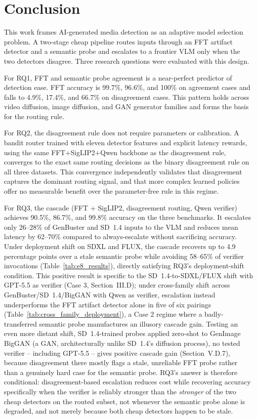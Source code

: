 \documentclass{ieeeaccess}
\begin{document}
\section{Conclusion}

This work frames AI-generated media detection as an adaptive model selection problem. A two-stage cheap pipeline routes inputs through an FFT artifact detector and a semantic probe and escalates to a frontier VLM only when the two detectors disagree. Three research questions were evaluated with this design.

For RQ1, FFT and semantic probe agreement is a near-perfect predictor of detection ease. FFT accuracy is 99.7\%, 96.6\%, and 100\% on agreement cases and falls to 4.9\%, 17.4\%, and 66.7\% on disagreement cases. This pattern holds across video diffusion, image diffusion, and GAN generator families and forms the basis for the routing rule.

For RQ2, the disagreement rule does not require parameters or calibration. A bandit router trained with eleven detector features and explicit latency rewards, using the same FFT+SigLIP2+Qwen backbone as the disagreement rule, converges to the exact same routing decisions as the binary disagreement rule on all three datasets. This convergence independently validates that disagreement captures the dominant routing signal, and that more complex learned policies offer no measurable benefit over the parameter-free rule in this regime.

For RQ3, the cascade (FFT + SigLIP2, disagreement routing, Qwen verifier) achieves 90.5\%, 86.7\%, and 99.8\% accuracy on the three benchmarks. It escalates only 26--28\% of GenBuster and SD~1.4 inputs to the VLM and reduces mean latency by 62--70\% compared to always-escalate without sacrificing accuracy. Under deployment shift on SDXL and FLUX, the cascade recovers up to 4.9 percentage
points over a stale semantic probe while avoiding 58--65\% of verifier invocations
(Table~\ref{tab:e8_results}), directly satisfying RQ3's deployment-shift condition. This
positive result is specific to the SD~1.4-to-SDXL/FLUX shift with GPT-5.5 as verifier
(Case 3, Section~III.D); under cross-family shift across GenBuster/SD~1.4/BigGAN with
Qwen as verifier, escalation instead underperforms the FFT artifact detector alone in
five of six pairings (Table~\ref{tab:cross_family_deployment}), a Case 2 regime where a
badly-transferred semantic probe manufactures an illusory cascade gain. Testing an even
more distant shift, SD~1.4-trained probes applied zero-shot to GenImage BigGAN (a GAN,
architecturally unlike SD~1.4's diffusion process), no tested verifier -- including
GPT-5.5 -- gives positive cascade gain (Section~V.D.7), because disagreement there
mostly flags a stale, unreliable FFT probe rather than a genuinely hard case for the
semantic probe. RQ3's answer is
therefore conditional: disagreement-based escalation reduces cost while recovering
accuracy specifically when the verifier is reliably stronger than the \emph{stronger} of
the two cheap detectors on the routed subset, not whenever the semantic probe alone is
degraded, and not merely because both cheap detectors happen to be stale.
\end{document}
